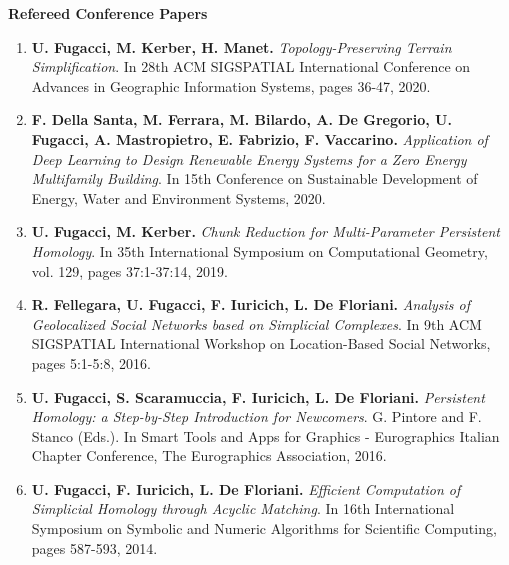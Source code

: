\documentclass[11pt]{article}
\begin{document}
\noindent
{\bf Refereed Conference Papers}
\begin{enumerate}

\item {\bf U. Fugacci, M. Kerber, H. Manet.} {\em Topology-Preserving Terrain Simplification}. In 28th ACM SIGSPATIAL International Conference on Advances in Geographic Information Systems, pages 36-47, 2020.

\item {\bf F. Della Santa, M. Ferrara, M. Bilardo, A. De Gregorio, U. Fugacci, A. Mastropietro, E. Fabrizio, F. Vaccarino.} {\em Application of Deep Learning to Design Renewable Energy Systems for a Zero Energy Multifamily Building}. In 15th Conference on Sustainable Development of Energy, Water and Environment Systems, 2020.

\item {\bf U. Fugacci, M. Kerber.} {\em Chunk Reduction for Multi-Parameter Persistent Homology}. In 35th International Symposium on Computational Geometry, vol. 129, pages 37:1-37:14, 2019.

\item {\bf R. Fellegara, U. Fugacci, F. Iuricich, L. De Floriani.} {\em Analysis of Geolocalized Social Networks based on Simplicial Complexes}. In 9th ACM SIGSPATIAL International Workshop on Location-Based Social Networks, pages 5:1-5:8, 2016.

\item {\bf U. Fugacci, S. Scaramuccia, F. Iuricich, L. De Floriani.} {\em Persistent Homology: a Step-by-Step Introduction for Newcomers}. G. Pintore and F. Stanco (Eds.). In Smart Tools and Apps for Graphics - Eurographics Italian Chapter Conference, The Eurographics Association, 2016.

\item {\bf U. Fugacci, F. Iuricich, L. De Floriani.} {\em Efficient Computation of Simplicial Homology through Acyclic Matching}. In 16th International Symposium on Symbolic and Numeric Algorithms for Scientific Computing, pages 587-593, 2014.

\end{enumerate}
\vspace*{1ex}
\end{document}
